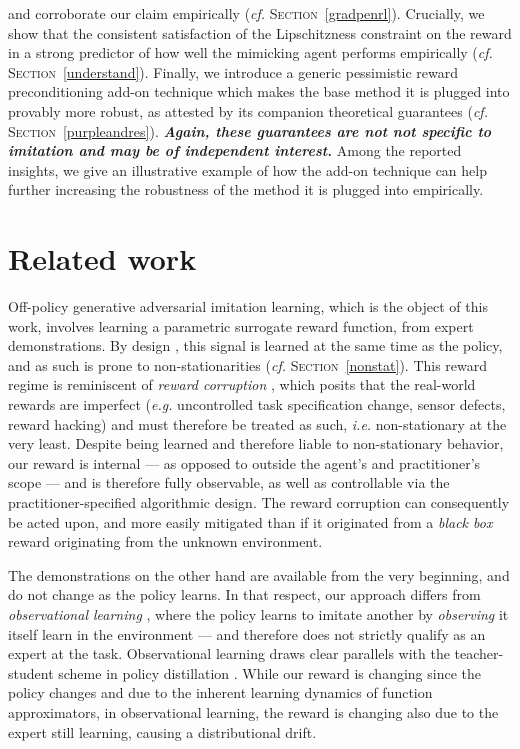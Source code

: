 and corroborate our claim empirically (\textit{cf.} \textsc{Section}~\ref{gradpenrl}).
Crucially, we show that
the consistent satisfaction of the Lipschitzness constraint on the reward
in a strong predictor of how well the mimicking agent performs empirically
(\textit{cf.} \textsc{Section}~\ref{understand}).
Finally, we introduce a generic pessimistic reward preconditioning add-on technique which
makes the base method it is plugged into provably more robust,
as attested by its companion theoretical guarantees
(\textit{cf.} \textsc{Section}~\ref{purpleandres}).
\textbf{\emph{Again, these guarantees
are not not specific to imitation and may be of independent interest.}}
Among the reported insights, we give an illustrative example of how the add-on technique can help further increasing
the robustness of the method it is plugged into empirically.

\section{Related work}
\label{related}

Off-policy generative adversarial imitation learning, which is the object of this work,
involves learning a parametric surrogate reward function, from expert demonstrations.
By design \cite{Ho2016-bv,Blonde2019-vc,Kostrikov2019-jo},
this signal is learned at the same time as the policy, and as such is prone to
non-stationarities (\textit{cf.} \textsc{Section}~\ref{nonstat}).
This reward regime is reminiscent of \emph{reward corruption}
\cite{Everitt2017-ql,Romoff2018-if}, which posits that the real-world rewards are imperfect
(\textit{e.g.} uncontrolled task specification change, sensor defects, reward hacking)
and must therefore be treated as such, \textit{i.e.} non-stationary at the very least.
Despite being learned and therefore liable to non-stationary behavior,
our reward is internal
--- as opposed to outside the agent's and practitioner's scope ---
and is therefore fully observable, as well as controllable via the practitioner-specified
algorithmic design.
The reward corruption can consequently be acted upon, and more easily mitigated than if
it originated from a \emph{black box} reward
originating from the unknown environment.

The demonstrations on the other hand are available from the very beginning,
and do not change as the policy learns.
In that respect, our approach differs from \textit{observational learning} \cite{Borsa2017-ab},
where the policy learns to imitate another by \emph{observing} it itself learn in the
environment --- and therefore does not strictly qualify as an expert at the task.
Observational learning draws clear parallels
with the teacher-student scheme in policy distillation \cite{Rusu2015-sr}.
While our reward is changing since the policy changes and due to the inherent learning
dynamics of function approximators, in observational learning, the reward is changing
also due to the expert still learning, causing a distributional drift.

